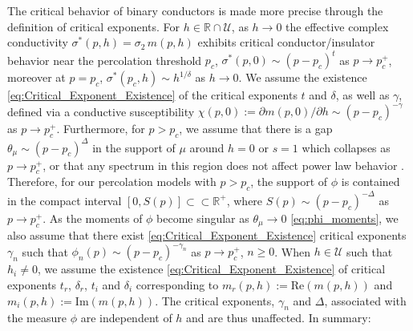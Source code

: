 \documentclass[english,12pt,jmp,graphicx]{revtex4-1}
\begin{document}
The critical behavior of binary conductors is made more precise
through the definition of critical exponents. For
$h\in\mathbb{R}\cap\mathcal{U}$, as $h\to0$ the effective complex conductivity
$\sigma^*(p,h)=\sigma_2\,m(p,h)$ exhibits critical conductor/insulator behavior
near the percolation threshold $p_c$, $\sigma^*(p,0)\sim(p-p_c)^t$ as
$p\to p_c^+$, moreover at $p=p_c$,
$\sigma^*(p_c,h)\sim h^{1/\delta}$ as $h\to0$. We assume the existence
\eqref{eq:Critical_Exponent_Existence} of the
critical exponents $t$ and $\delta$, as well as $\gamma$, defined via a
conductive susceptibility $\chi(p,0):=\partial m(p,0)/\partial h\sim(p-p_c)^{-\gamma}$ as
$p\to p_c^+$. Furthermore, for $p>p_c$, we assume that there is a gap 
$\theta_\mu\sim(p-p_c)^\Delta$ in the support of $\mu$ around $h=0$ or $s=1$ which
collapses as $p\to p_c^+$, or that any spectrum in this region does not
affect power law behavior \cite{Golden:PRL-3935}. Therefore, for our
percolation models with $p>p_c$, the support of $\phi$ is contained in
the compact interval $[0,S(p)]\subset\subset\mathbb{R}^+$, where $S(p)\sim(p-p_c)^{-\Delta}$ as
$p\to p_c^+$. As the moments of $\phi$ become singular as $\theta_\mu\to0$ 
\eqref{eq:phi_moments}, we also assume that there exist
\eqref{eq:Critical_Exponent_Existence} critical
exponents $\gamma_n$ such that $\phi_n(p)\sim(p-p_c)^{-\gamma_n}$ as $p\to p_c^+$,
$n\geq0$. When $h\in\mathcal{U}$ such that $h_i\neq0$, we
assume the existence \eqref{eq:Critical_Exponent_Existence} of
critical exponents $t_r$, $\delta_r$, $t_i$ and $\delta_i$ corresponding to
$m_r(p,h):=\text{Re}(m(p,h))$ and $m_i(p,h):=\text{Im}(m(p,h))$. The
critical exponents, $\gamma_n$ and $\Delta$, associated with the measure $\phi$ are
independent of $h$ and are thus unaffected. In summary:  
\end{document}
